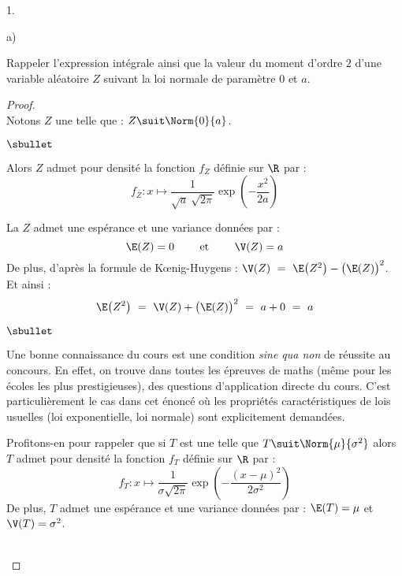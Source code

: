 \begin{noliste}{1.}
\begin{noliste}{a)}
  \item Rappeler l'expression intégrale ainsi que la valeur du moment
    d'ordre $2$ d'une variable aléatoire $Z$ suivant la loi normale de
    paramètre $0$ et $a$.

    \begin{proof}~\\%
      Notons $Z$ une \var telle que : $Z \suit \Norm{0}{a}$.
      \begin{noliste}{$\sbullet$}
      \item Alors $Z$ admet pour densité la fonction $f_Z$ définie sur
        $\R$ par : 
        \[
        f_Z : x \mapsto \dfrac{1}{\sqrt{a} \ \sqrt{2\pi}}
        \exp\left(-\dfrac{x^2}{2a} \right)
        \]

      \item La \var $Z$ admet une espérance et une variance données
        par :
        \[
        \E(Z) = 0 \qquad \text{ et } \qquad \V(Z) = a
        \]
        De plus, d'après la formule de K\oe{}nig-Huygens : $\V(Z) \ =
        \ \E\big( Z^2 \big) - \big( \E(Z) \big)^2$. Et ainsi :
        \[
        \E\big( Z^2 \big) \ = \ \V(Z) + \big( \E(Z) \big)^2 \ = \ a +
        0 \ = \ a
        \]
      \end{noliste}
    \begin{remarkL}{.97}%
      \begin{noliste}{$\sbullet$}
      \item Une bonne connaissance du cours est une condition {\it
          sine qua non} de réussite au concours. En effet, on trouve
        dans toutes les épreuves de maths (même pour les écoles les
        plus prestigieuses), des questions d'application directe du
        cours. C'est particulièrement le cas dans cet énoncé où les
        propriétés caractéristiques de lois usuelles (loi
        exponentielle, loi normale) sont explicitement demandées.
      \item Profitons-en pour rappeler que si $T$ est une \var telle
        que $T \suit \Norm{\mu}{\sigma^2}$ alors $T$ admet pour
        densité la fonction $f_T$ définie sur $\R$ par :
        \[
        f_T : x \mapsto \dfrac{1}{\sigma\sqrt{2\pi}}
        \exp\left(-\dfrac{(x-\mu)^2}{2\sigma^2} \right)
        \]
        De plus, $T$ admet une espérance et une variance données par :
        $\E(T) = \mu$ et $\V(T) = \sigma^2$.
      \end{noliste}
    \end{remarkL}~\\[-1.4cm]
    \end{proof}


\end{noliste}
\end{noliste}
